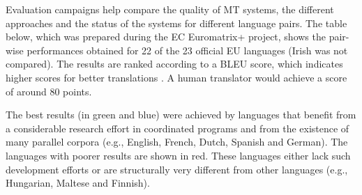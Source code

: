 \begin{multicols}{2}
Evaluation campaigns help compare the quality of MT systems, the different approaches and the status of the systems for different language pairs. The table below, which was prepared during the EC Euromatrix+ project, shows the pair-wise performances obtained for 22 of the 23 official EU languages (Irish was not compared). The results are ranked according to a BLEU score, which indicates higher scores for better translations \cite{bleu1}.  A human translator would achieve a score of around 80 points.

The best results (in green and blue) were achieved by languages that benefit from a considerable research effort in coordinated programs and from the existence of many parallel corpora (e.g., English, French, Dutch, Spanish and German). The languages with poorer results are shown in red. These languages either lack such development efforts or are structurally very different from other languages (e.g., Hungarian, Maltese and Finnish).



\end{multicols}
